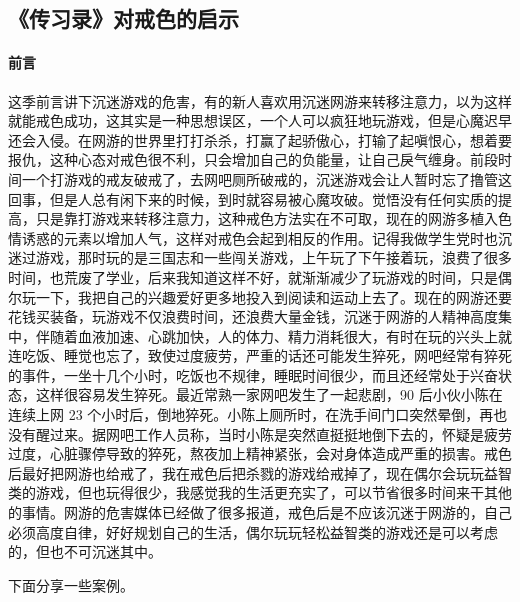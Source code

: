 \subsection{《传习录》对戒色的启示}

\paragraph*{前言}

这季前言讲下沉迷游戏的危害，有的新人喜欢用沉迷网游来转移注意力，以为这样就能戒色成功，这其实是一种思想误区，一个人可以疯狂地玩游戏，但是心魔迟早还会入侵。在网游的世界里打打杀杀，打赢了起骄傲心，打输了起嗔恨心，想着要报仇，这种心态对戒色很不利，只会增加自己的负能量，让自己戾气缠身。前段时间一个打游戏的戒友破戒了，去网吧厕所破戒的，沉迷游戏会让人暂时忘了撸管这回事，但是人总有闲下来的时候，到时就容易被心魔攻破。觉悟没有任何实质的提高，只是靠打游戏来转移注意力，这种戒色方法实在不可取，现在的网游多植入色情诱惑的元素以增加人气，这样对戒色会起到相反的作用。记得我做学生党时也沉迷过游戏，那时玩的是三国志和一些闯关游戏，上午玩了下午接着玩，浪费了很多时间，也荒废了学业，后来我知道这样不好，就渐渐减少了玩游戏的时间，只是偶尔玩一下，我把自己的兴趣爱好更多地投入到阅读和运动上去了。现在的网游还要花钱买装备，玩游戏不仅浪费时间，还浪费大量金钱，沉迷于网游的人精神高度集中，伴随着血液加速、心跳加快，人的体力、精力消耗很大，有时在玩的兴头上就连吃饭、睡觉也忘了，致使过度疲劳，严重的话还可能发生猝死，网吧经常有猝死的事件，一坐十几个小时，吃饭也不规律，睡眠时间很少，而且还经常处于兴奋状态，这样很容易发生猝死。最近常熟一家网吧发生了一起悲剧，90 后小伙小陈在连续上网 23 个小时后，倒地猝死。小陈上厕所时，在洗手间门口突然晕倒，再也没有醒过来。据网吧工作人员称，当时小陈是突然直挺挺地倒下去的，怀疑是疲劳过度，心脏骤停导致的猝死，熬夜加上精神紧张，会对身体造成严重的损害。戒色后最好把网游也给戒了，我在戒色后把杀戮的游戏给戒掉了，现在偶尔会玩玩益智类的游戏，但也玩得很少，我感觉我的生活更充实了，可以节省很多时间来干其他的事情。网游的危害媒体已经做了很多报道，戒色后是不应该沉迷于网游的，自己必须高度自律，好好规划自己的生活，偶尔玩玩轻松益智类的游戏还是可以考虑的，但也不可沉迷其中。

下面分享一些案例。

